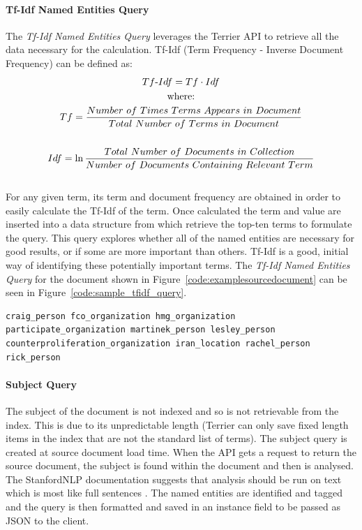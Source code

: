 \documentclass{l4proj}
\newenvironment{codelisting}{\captionsetup{type=listing}}{}
\begin{document}
\paragraph{Tf-Idf Named Entities Query} \label{tfidfquery}
The \textit{Tf-Idf Named Entities Query} leverages the Terrier API to retrieve all the data necessary for the calculation.
Tf-Idf (Term Frequency - Inverse Document Frequency) can be defined as:
\begin{gather*}
Tf\textnormal{-}Idf = Tf \cdot Idf \\
\textnormal{where:} \\ 
Tf = \frac{Number\ of\ Times\ Terms\ Appears\ in\ Document}{Total\ Number\ of\ Terms\ in\ Document} \\ \\
Idf = \ln{\frac{Total\ Number\ of\ Documents\ in\ Collection}{Number\ of\ Documents\ Containing\ Relevant\ Term}}
\end{gather*}
\hfill \cite{Manning:2008:IIR:1394399}\\
For any given term, its term and document frequency are obtained in order to easily calculate the Tf-Idf of the term. Once calculated the term and value are inserted into a data structure from which retrieve the top-ten terms to formulate the query. This query explores whether all of the named entities are necessary for good results, or if some are more important than others. Tf-Idf is a good, initial way of identifying these potentially important terms. The \textit{Tf-Idf Named Entities Query} for the document shown in Figure~\ref{code:examplesourcedocument} can be seen in Figure~\ref{code:sample_tfidf_query}.
\begin{codelisting}
\begin{verbatim}
craig_person fco_organization hmg_organization participate_organization martinek_person lesley_person counterproliferation_organization iran_location rachel_person rick_person
\end{verbatim}
\label{code:sample_tfidf_query}
\end{codelisting}
\paragraph{Subject Query}
The subject of the document is not indexed and so is not retrievable from the index. This is due to its unpredictable length (Terrier can only save fixed length items in the index that are not the standard list of terms).
The subject query is created at source document load time. When the API gets a request to return the source document, the subject is found within the document and then is analysed. The StanfordNLP documentation suggests that analysis should be run on text which is most like full sentences \cite{caselessmodels}. The named entities are identified and tagged and the query is then formatted and saved in an instance field to be passed as JSON to the client.
\end{document}

